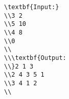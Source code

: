 \begin{verbatim}
\textbf{Input:}
\\3 2
\\5 10
\\4 8
\\0
\\
\\\textbf{Output:
\\}2 1 3
\\2 4 3 5 1
\\3 4 1 2
\\\end{verbatim}